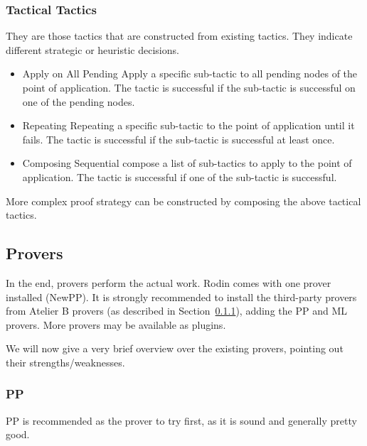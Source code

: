 \subsubsection{Tactical Tactics}

They are those tactics that are constructed from existing tactics. They indicate different strategic or heuristic decisions.

\begin{itemize}
	\item         Apply on All Pending Apply a specific sub-tactic to all pending nodes of the point of application. The tactic is successful if the sub-tactic is successful on one of the pending nodes. 
	\item         Repeating Repeating a specific sub-tactic to the point of application until it fails. The tactic is successful if the sub-tactic is successful at least once. 
	\item         Composing Sequential compose a list of sub-tactics to apply to the point of application. The tactic is successful if one of the sub-tactic is successful. 
\end{itemize}

More complex proof strategy can be constructed by composing the above tactical tactics. 

\subsection{Provers}
\label{atelier_b_provers}

In the end, provers perform the actual work.  Rodin comes with one prover installed (NewPP).  It is strongly recommended to install the third-party provers from Atelier B provers (as described in Section~\ref{}), adding the PP and ML provers.  More provers may be available as plugins.

We will now give a very brief overview over the existing provers, pointing out their strengths/weaknesses.

\subsubsection{PP}

PP is recommended as the prover to try first, as it is sound and generally pretty good.


